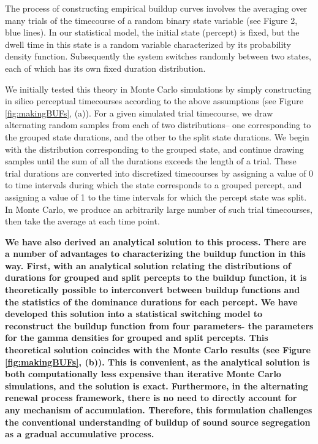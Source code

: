 \documentclass[10pt]{article}
\begin{document}
The process of constructing empirical buildup curves involves the averaging over many trials of the timecourse of a random binary state variable (see Figure 2, blue lines). In our statistical model, the initial state (percept) is fixed, but the dwell time in this state is a random variable characterized by its probability density function. Subsequently the system switches randomly between two states, each of which has its own fixed duration distribution.


We initially tested this theory in Monte Carlo simulations by simply constructing in silico perceptual timecourses according to the above assumptions (see Figure \ref{fig:makingBUFs}, (a)). For a given simulated trial timecourse, we draw alternating random samples from each of two distributions-- one corresponding to the grouped state durations, and the other to the split state durations. We begin with the distribution corresponding to the grouped state, and continue drawing samples until the sum of all the durations exceeds the length of a trial. These trial durations are converted into discretized timecourses by assigning a value of 0 to time intervals during which the state corresponds to a grouped percept, and assigning a value of 1 to the time intervals for which the percept state was split. In Monte Carlo, we produce an arbitrarily large number of such trial timecourses, then take the average at each time point. 

\textbf{We have also derived an analytical solution to this process. There are a number of advantages to characterizing the buildup function in this way. First, with an analytical solution relating the distributions of durations for grouped and split percepts to the buildup function, it is theoretically possible to interconvert between buildup functions and the statistics of the dominance durations for each percept. We have developed this solution into a statistical switching model to reconstruct the buildup function from four parameters- the parameters for the gamma densities for grouped and split percepts. This theoretical solution coincides with the Monte Carlo results  (see Figure \ref{fig:makingBUFs}, (b)). This is convenient, as the analytical solution is both computationally less expensive than iterative Monte Carlo simulations, and the solution is exact. Furthermore, in the alternating renewal process framework, there is no need to directly account for any mechanism of accumulation. Therefore, this formulation challenges the conventional understanding of buildup of sound source segregation as a gradual accumulative process.}
	
\end{document}
